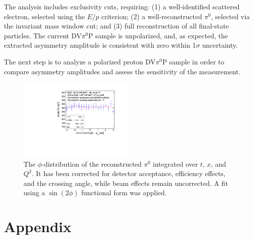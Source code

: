 \documentclass[letterpaper,12pt]{article}
\begin{document}
The analysis includes exclusivity cuts, requiring: (1) a well-identified scattered electron, selected using the $E/p$ criterion; (2) a well-reconstructed $\pi^{0}$, selected via the invariant mass window cut; and (3) full reconstruction of all final-state particles. The current DV$\pi^{0}$P sample is unpolarized, and, as expected, the extracted asymmetry amplitude is consistent with zero within 1$\sigma$ uncertainty.

The next step is to analyze a polarized proton DV$\pi^{0}$P sample in order to compare asymmetry amplitudes and assess the sensitivity of the measurement.

\begin{figure}[ht]
    \centering
    \includegraphics[width=0.5\textwidth]{Figures/phi_distribution_corrected_fit.pdf}
    \caption{The $\phi$-distribution of the reconstructed $\pi^{0}$ integrated over $t$, $x$, and $Q^{2}$. It has been corrected for detector acceptance, efficiency effects, and the crossing angle, while beam effects remain uncorrected. A fit using a $\sin(2\phi)$ functional form was applied.}
\label{fig:phidist}
\end{figure}


\appendix
\section{Appendix}


 

\end{document}
